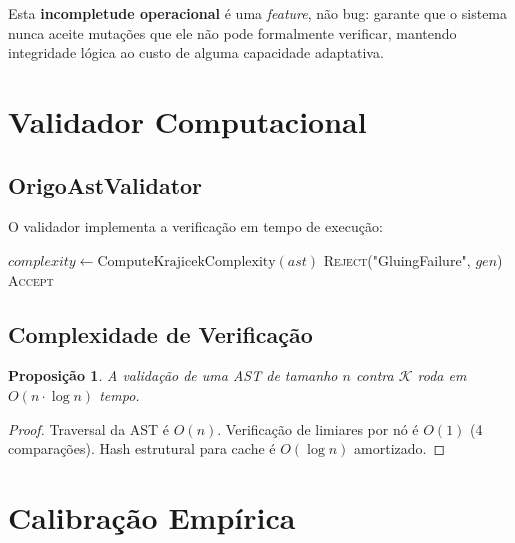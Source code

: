\documentclass[11pt,a4paper]{article}
\newtheorem{proposition}[theorem]{Proposição}
\newcommand{\rhoT}{\rho_T}
\newcommand{\BT}{B_T}
\newcommand{\CT}{C_T}
\newcommand{\RT}{R_T}
\begin{document}
\begin{remark}
Esta \textbf{incompletude operacional} é uma \textit{feature}, não bug: garante que o sistema nunca aceite mutações que ele não pode formalmente verificar, mantendo integridade lógica ao custo de alguma capacidade adaptativa.
\end{remark}

\section{Validador Computacional}

\subsection{OrigoAstValidator}

O validador implementa a verificação em tempo de execução:

\begin{algorithm}
\caption{ValidateMutation(AST, $\mathcal{K}$)}
\begin{algorithmic}[1]
    \State $complexity \gets \text{ComputeKrajicekComplexity}(ast)$
    \ForEach{$gen \in \{ \rhoT, \BT, \CT, \RT \}$}
            \State \Return \textsc{Reject}("GluingFailure", $gen$)
        \EndIf
    \EndFor
    \State \Return \textsc{Accept}
\EndFunction
\end{algorithmic}
\end{algorithm}

\subsection{Complexidade de Verificação}

\begin{proposition}
A validação de uma AST de tamanho $n$ contra $\mathcal{K}$ roda em $O(n \cdot \log n)$ tempo.
\end{proposition}

\begin{proof}
Traversal da AST é $O(n)$. Verificação de limiares por nó é $O(1)$ (4 comparações). Hash estrutural para cache é $O(\log n)$ amortizado.
\end{proof}

\section{Calibração Empírica}
\end{document}

